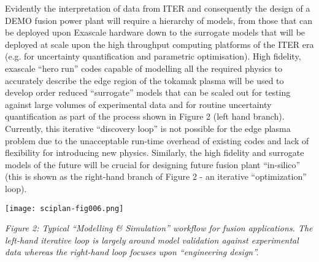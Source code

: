 \documentclass{article}
\begin{document}
\vspace{24pt}
Evidently the interpretation of data from ITER and consequently the design of a 
DEMO fusion power plant will require a hierarchy of models, from those that can 
be deployed upon Exascale hardware down to the surrogate models that will be deployed 
at scale upon the high throughput computing platforms of the ITER era (e.g. for 
uncertainty quantification and parametric optimisation). High fidelity, exascale 
``hero run'' codes capable of modelling all the required physics to accurately 
describe the edge region of the tokamak plasma will be used to develop order reduced 
``surrogate'' models that can be scaled out for testing against large volumes of 
experimental data and for routine uncertainty quantification as part of the process 
shown in Figure 2 (left hand branch). Currently, this iterative ``discovery loop'' 
is not possible for the edge plasma problem due to the unacceptable run-time overhead 
of existing codes and lack of flexibility for introducing new physics. Similarly, 
the high fidelity and surrogate models of the future will be crucial for designing 
future fusion plant ``in-silico'' (this is shown as the right-hand branch of Figure 
2 - an iterative ``optimization'' loop). 

\vspace{24pt}
\begin{center}
\texttt{[image: sciplan-fig006.png]}

\end{center}

\vspace{37pt}
\baselineskip=12pt
\leftskip=28pt
\textit{Figure 2: Typical ``Modelling \& Simulation'' workflow for fusion applications. 
The left-hand iterative loop is largely around model validation against experimental 
data whereas the right-hand loop focuses upon ``engineering design''.}
\end{document}
